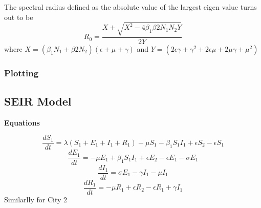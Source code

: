 \documentclass{article}
\begin{document}
The spectral radius defined as the absolute value of the largest eigen value turns out to be
$$R_{0}=\frac{X+\sqrt{X^{2}-4\beta_{1}\beta{2}N_{1}N_{2}Y}}{2Y}$$
where $X=(\beta_{1} N_{1}+\beta{2} N_{2})(\epsilon+\mu+\gamma)$ and
$Y=(2 \epsilon \gamma+\gamma^{2}+2 \epsilon \mu+ 2 \mu \gamma+
\mu^{2})$
\subsubsection{Plotting}

\subsection{SEIR Model}
\textbf{Equations} \newline

$$\frac{dS_{1}}{dt}=\lambda(S_{1}+E_{1}+I_{1}+R_{1}) -\mu  S_{1} - \beta_{1} S_{1}I_{1}  + \epsilon S_{2} -\epsilon S_{1} $$
$$\frac{dE_{1}}{dt}= -\mu  E_{1} + \beta_{1} S_{1}I_{1}  + \epsilon E_{2} -\epsilon E_{1} -\sigma  E_{1} $$
$$\frac{dI_{1}}{dt}= \sigma E_{1} -\gamma I_{1} -\mu I_{1}$$
$$\frac{dR_{1}}{dt}= -\mu  R_{1} +  \epsilon R_{2} -\epsilon R_{1} +\gamma I_{1} $$
Similarlly for City 2
\end{document}
